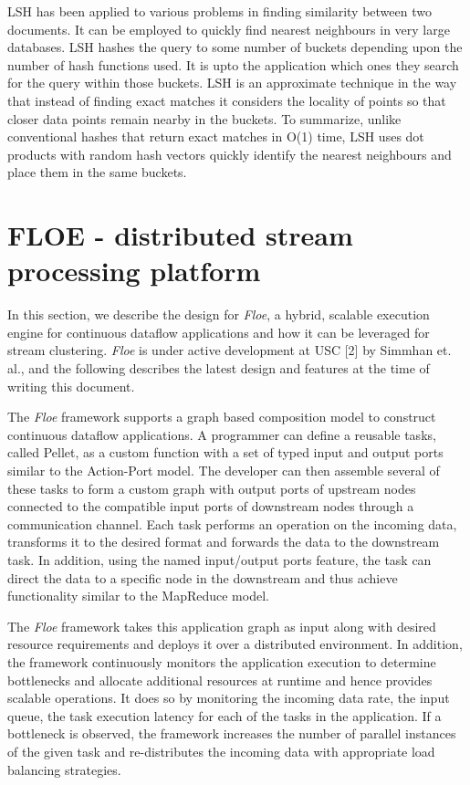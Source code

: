 \documentclass{article} %
\newcommand{\floe}{\emph{Floe }}
\begin{document}
LSH has been applied to various problems in finding similarity between two documents. It can be employed to quickly find nearest neighbours in very large databases. LSH hashes the query to some number of buckets depending upon the number of hash functions used. It is upto the application which ones they search for the query within those buckets. LSH is an approximate technique in the way that instead of finding exact matches it considers the locality of points so that closer data points remain nearby in the buckets. To summarize, unlike conventional hashes that return exact matches in O(1) time, LSH uses dot products with random hash vectors quickly identify the nearest neighbours and place them in the same buckets.



\section{FLOE - distributed stream processing platform}
\label{sec:floe}
In this section, we describe the design for \textit{Floe}, a hybrid, scalable execution engine for continuous dataflow applications and how it can be leveraged for stream clustering. \textit{Floe} is under active development at USC [2] by Simmhan et. al., and the following describes the latest design and features at the time of writing this document. 

The \floe framework supports a graph based composition model to construct continuous dataflow applications. A programmer can define a reusable tasks, called Pellet, as a custom function with a set of typed input and output ports similar to the Action-Port model. The developer can then assemble several of these tasks to form a custom graph with output ports of upstream nodes connected to the compatible input ports of downstream nodes through a communication channel. Each task performs an operation on the incoming data, transforms it to the desired format and forwards the data to the downstream task. In addition, using the named input/output ports feature, the task can direct the data to a specific node in the downstream and thus achieve functionality similar to the MapReduce model.

The \floe framework takes this application graph as input along with desired resource requirements and deploys it over a distributed environment. In addition, the framework continuously monitors the application execution to determine bottlenecks and allocate additional resources at runtime and hence provides scalable operations. It does so by monitoring the incoming data rate, the input queue, the task execution latency for each of the tasks in the application. If a bottleneck is observed, the framework increases the number of parallel instances of the given task and re-distributes the incoming data with appropriate load balancing strategies.
 
\end{document}

